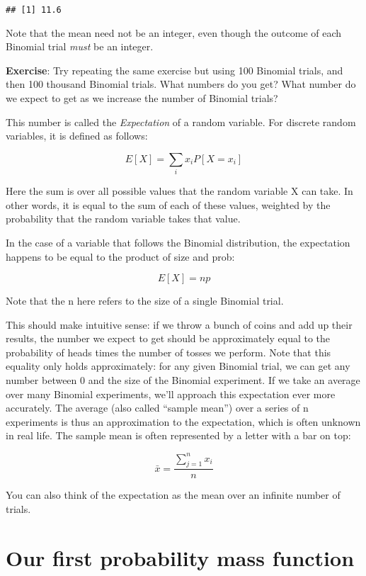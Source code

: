 \documentclass[
]{book}
\begin{document}
\begin{verbatim}
## [1] 11.6
\end{verbatim}

Note that the mean need not be an integer, even though the outcome of each Binomial trial \emph{must} be an integer.

\textbf{Exercise}: Try repeating the same exercise but using 100 Binomial trials, and then 100 thousand Binomial trials. What numbers do you get? What number do we expect to get as we increase the number of Binomial trials?

This number is called the \emph{Expectation} of a random variable. For discrete random variables, it is defined as follows:

\[E[X] = \sum_{i}x_iP[X=x_i]\]

Here the sum is over all possible values that the random variable X can take. In other words, it is equal to the sum of each of these values, weighted by the probability that the random variable takes that value.

In the case of a variable that follows the Binomial distribution, the expectation happens to be equal to the product of size and prob:

\[E[X] = np\]

Note that the n here refers to the size of a single Binomial trial.

This should make intuitive sense: if we throw a bunch of coins and add up their results, the number we expect to get should be approximately equal to the probability of heads times the number of tosses we perform. Note that this equality only holds approximately: for any given Binomial trial, we can get any number between 0 and the size of the Binomial experiment. If we take an average over many Binomial experiments, we'll approach this expectation ever more accurately. The average (also called ``sample mean'') over a series of n experiments is thus an approximation to the expectation, which is often unknown in real life. The sample mean is often represented by a letter with a bar on top:

\[\bar{x} = \frac{\sum_{j=1}^{n}x_{i}}{n}\]

You can also think of the expectation as the mean over an infinite number of trials.

\hypertarget{our-first-probability-mass-function}{%
\section{Our first probability mass function}\label{our-first-probability-mass-function}}
\end{document}

